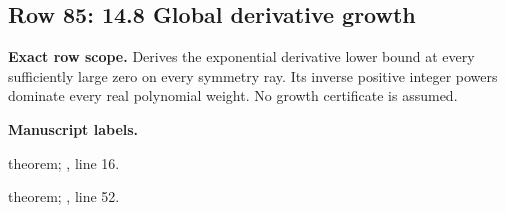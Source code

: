\subsection{Row 85: 14.8 Global derivative growth}
\label{row:85}
\textbf{Exact row scope.} Derives the exponential derivative lower bound at every sufficiently large zero on every symmetry ray. Its inverse positive integer powers dominate every real polynomial weight. No growth certificate is assumed.\par\smallskip
\textbf{Manuscript labels.} \par\smallskip
{\small{}\par}
{\footnotesize\color{muted}theorem; , line 16.\par}\smallskip
{\small{}\par}
{\footnotesize\color{muted}theorem; , line 52.\par}\smallskip
{}
